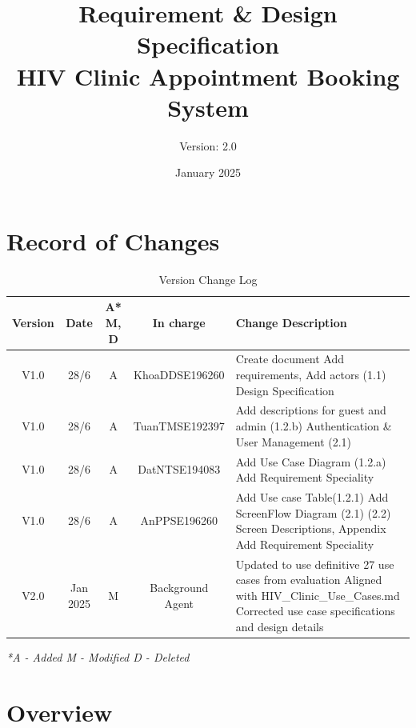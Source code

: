 \documentclass[12pt,a4paper]{article}
\title{\textbf{Requirement \& Design Specification\\HIV Clinic Appointment Booking System}}
\author{Version: 2.0}
\date{January 2025}
\begin{document}
\maketitle
\thispagestyle{empty}

\newpage

\section*{Record of Changes}

\begin{table}[h!]
\centering
\renewcommand{\arraystretch}{1.5}
\begin{tabular}{|c|c|c|c|p{7.5cm}|}
\hline
\textbf{Version} & \textbf{Date} & \textbf{A* M, D} & \textbf{In charge} & \textbf{Change Description} \\
\hline
V1.0 & 28/6 & A & KhoaDDSE196260 & 
Create document \newline
Add requirements, Add actors (1.1) \newline
Design Specification\\
\hline
V1.0 & 28/6 & A & TuanTMSE192397 & 
Add descriptions for guest and admin (1.2.b) \newline
Authentication \& User Management (2.1) \\
\hline
V1.0 & 28/6 & A & DatNTSE194083 & 
Add Use Case Diagram (1.2.a)\newline 
Add Requirement Speciality
\\
\hline
V1.0 & 28/6 & A & AnPPSE196260 & 
Add Use case Table(1.2.1)
Add ScreenFlow Diagram (2.1) \newline
(2.2) Screen Descriptions, Appendix\newline 
Add Requirement Speciality\\
\hline
V2.0 & Jan 2025 & M & Background Agent & 
Updated to use definitive 27 use cases from evaluation \newline
Aligned with HIV_Clinic_Use_Cases.md \newline
Corrected use case specifications and design details\\
\hline
\end{tabular}
\caption{Version Change Log}
\label{tab:version-log}
\end{table}

\textit{*A - Added M - Modified D - Deleted}

\newpage

\tableofcontents

\newpage

\section{Overview}
\end{document}

